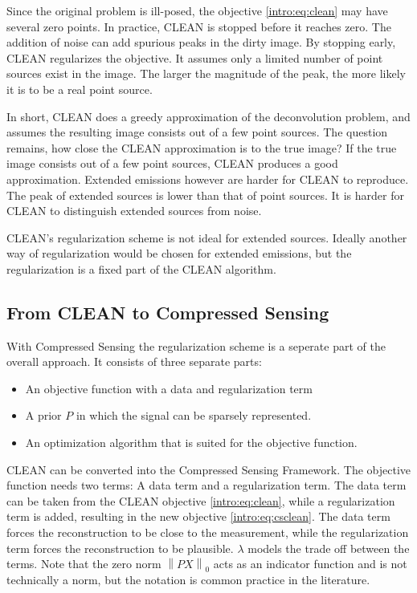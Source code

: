Since the original problem is ill-posed, the objective \eqref{intro:eq:clean} may have several zero points. In practice, CLEAN is stopped before it reaches zero. The addition of noise can add spurious peaks in the dirty image. By stopping early, CLEAN regularizes the objective. It assumes only a limited number of point sources exist in the image. The larger the magnitude of the peak, the more likely it is to be a real point source.

In short, CLEAN does a greedy approximation of the deconvolution problem, and assumes the resulting image consists out of a few point sources. The question remains, how close the CLEAN approximation is to the true image? If the true image consists out of a few point sources, CLEAN produces a good approximation. Extended emissions however are harder for CLEAN to reproduce. The peak of extended sources is lower than that of point sources. It is harder for CLEAN to distinguish extended sources from noise.

CLEAN's regularization scheme is not ideal for extended sources. Ideally another way of regularization would be chosen for extended emissions, but the regularization is a fixed part of the CLEAN algorithm.


\subsection{From CLEAN to Compressed Sensing}
With Compressed Sensing the regularization scheme is a seperate part of the overall approach. It consists of three separate parts:
\begin{itemize}
	\item An objective function with a data and regularization term
	\item A prior $P$ in which the signal can be sparsely represented.
	\item An optimization algorithm that is suited for the objective function.
\end{itemize}

CLEAN can be converted into the Compressed Sensing Framework. The objective function needs two terms: A data term and a regularization term. The data term can be taken from the CLEAN objective \eqref{intro:eq:clean}, while a regularization term is added, resulting in the new objective \eqref{intro:eq:csclean}. The data term forces the reconstruction to be close to the measurement, while the regularization term forces the reconstruction to be plausible. $\lambda$ models the trade off between the terms. Note that the zero norm $\left \| PX \right \|_0$ acts as an indicator function and is not technically a norm, but the notation is common practice in the literature.

